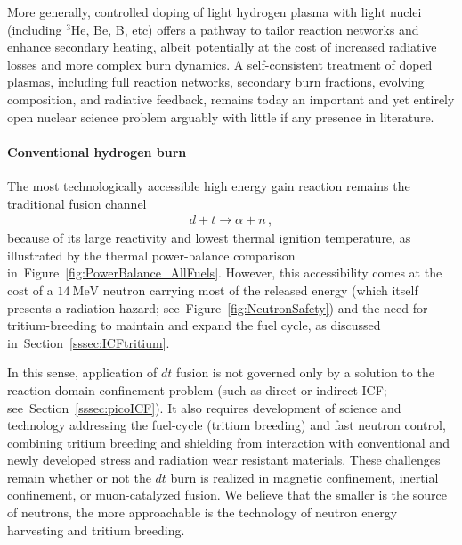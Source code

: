 \documentclass[particles,article,accept,pdftex,moreauthors]{Definitions/mdpi}
\begin{document}
More generally, controlled doping of light hydrogen plasma with light nuclei (including ${}^3$He, Be, B, etc) offers a pathway to tailor reaction networks and enhance secondary heating, albeit potentially at the cost of increased radiative losses and more complex burn dynamics. A self-consistent treatment of doped plasmas, including full reaction networks, secondary burn fractions, evolving composition, and radiative feedback, remains today an important and yet entirely open nuclear science problem arguably with little if any presence in literature.

\paragraph*{\bf Conventional hydrogen burn}
The most technologically accessible high energy gain reaction remains the traditional fusion channel
\begin{align}
 d+t\to \alpha+n\,,
\end{align}
because of its large reactivity and lowest thermal ignition temperature, as illustrated by the thermal power-balance comparison in~Figure~\ref{fig:PowerBalance_AllFuels}. However, this accessibility comes at the cost of a $14~\mathrm{MeV}$ neutron carrying most of the released energy (which itself presents a radiation hazard; see~Figure~\ref{fig:NeutronSafety}) and the need for tritium-breeding to maintain and expand the fuel cycle, as discussed in~Section~\ref{sssec:ICFtritium}. 

In this sense, application of $dt$ fusion is not governed only by a solution to the reaction domain confinement problem (such as direct or indirect ICF; see~Section~\ref{sssec:picoICF}). It also requires development of science and technology addressing the fuel-cycle (tritium breeding) and fast neutron control, combining tritium breeding and shielding from interaction with conventional and newly developed stress and radiation wear resistant materials. These challenges remain whether or not the $dt$ burn is realized in magnetic confinement, inertial confinement, or muon-catalyzed fusion. We believe that the smaller is the source of neutrons, the more approachable is the technology of neutron energy harvesting and tritium breeding.
\end{document}
